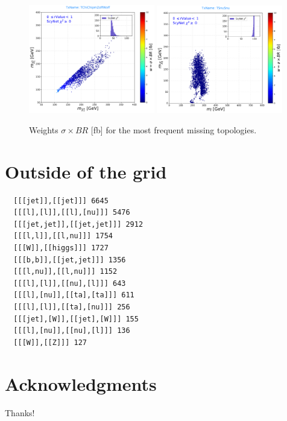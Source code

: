 \documentclass[a4paper,11pt]{article}
\begin{document}
\begin{figure}[!b]
	\subfigure
	{\includegraphics[width=0.49\textwidth]{Fig/Res/Missing_Weights/TChiChipmZoff_Woff.pdf}}	
	\subfigure
	{\includegraphics[width=0.49\textwidth]{Fig/Res/Missing_Weights/TSnuSnu.pdf}}	
	
	
	\caption{Weights $\sigma \times BR$ [fb] for the most frequent missing topologies.}
	\label{masses}
\end{figure}




\section{Outside of the grid}

\begin{verbatim}
  [[[jet]],[[jet]]] 6645
  [[[l],[l]],[[l],[nu]]] 5476
  [[[jet,jet]],[[jet,jet]]] 2912
  [[[l,l]],[[l,nu]]] 1754
  [[[W]],[[higgs]]] 1727
  [[[b,b]],[[jet,jet]]] 1356
  [[[l,nu]],[[l,nu]]] 1152
  [[[l],[l]],[[nu],[l]]] 643
  [[[l],[nu]],[[ta],[ta]]] 611
  [[[l],[l]],[[ta],[nu]]] 256
  [[[jet],[W]],[[jet],[W]]] 155
  [[[l],[nu]],[[nu],[l]]] 136
  [[[W]],[[Z]]] 127
\end{verbatim}




\clearpage


\section*{Acknowledgments}
Thanks!
%


\end{document}
